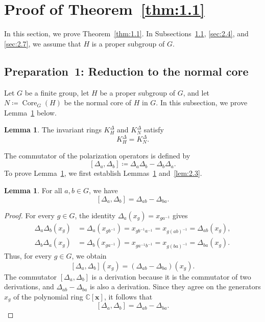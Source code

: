 \documentclass[12pt,a4paper]{article}
\theoremstyle{definition}
\newtheorem{lem}[definition]{Lemma}
\numberwithin{definition}{section}
\DeclareMathOperator{\Core}{Core}
\begin{document}
\section{Proof of Theorem~\ref{thm:1.1}}
In this section, we prove Theorem~\ref{thm:1.1}.
In Subsections~\ref{sec:2.1}, \ref{sec:2.4}, and \ref{sec:2.7},
we assume that $H$ is a proper subgroup of $G$.

\subsection{Preparation~1: Reduction to the normal core}\label{sec:2.1}
Let $G$ be a finite group, let $H$ be a proper subgroup of $G$,
and let $N\coloneqq\Core_G(H)$ be the normal core of $H$ in $G$.
In this subsection, we prove Lemma~\ref{lem:2.1} below.

\begin{lem}\label{lem:2.1}
The invariant rings $K_H^\Delta$ and $K_N^\Delta$ satisfy
\[
 K_H^{\Delta} = K_{N}^{\Delta}.
\]
\end{lem}

The commutator of the polarization operators is defined by
\[
[\Delta_{a}, \Delta_{b}] \coloneqq \Delta_{a} \Delta_{b} - \Delta_{b} \Delta_{a}.
\]
To prove Lemma~\ref{lem:2.1}, we first establish
Lemmas~\ref{lem:2.2} and~\ref{lem:2.3}.

\begin{lem}\label{lem:2.2}
For all $a,b\in G$, we have
\[
[\Delta_{a}, \Delta_{b}] = \Delta_{a b} - \Delta_{b a}.
\]
\end{lem}
\begin{proof}
For every $g\in G$, the identity $\Delta_a(x_g)=x_{ga^{-1}}$ gives
\begin{align*}
\Delta_{a} \Delta_{b}(x_{g})
&= \Delta_{a}(x_{g b^{-1}})
= x_{g b^{-1} a^{-1}}
= x_{g (a b)^{-1}}
= \Delta_{a b}(x_{g}), \\
\Delta_{b} \Delta_{a}(x_{g})
&= \Delta_{b}(x_{g a^{-1}})
= x_{g a^{-1} b^{-1}}
= x_{g (b a)^{-1}}
= \Delta_{b a}(x_{g}).
\end{align*}
Thus, for every $g\in G$, we obtain
\[
 [\Delta_a, \Delta_b](x_g)
 =
 (\Delta_{a b} - \Delta_{b a})(x_g).
\]
The commutator $[\Delta_a,\Delta_b]$ is a derivation because
it is the commutator of two derivations, and
$\Delta_{ab}-\Delta_{ba}$ is also a derivation.
Since they agree on the generators $x_g$ of the polynomial ring
$\mathbb C[\bm x]$, it follows that
\[
 [\Delta_a, \Delta_b]
 =
 \Delta_{a b} - \Delta_{b a}.
\]
\end{proof}
\end{document}
